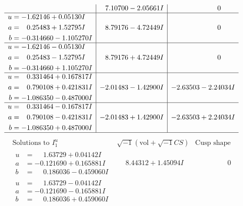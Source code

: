 \documentclass[1p]{elsarticle_modified}
\theoremstyle{definition}
\newcommand{\I}{\sqrt{-1}}
\begin{document}
$$\begin{array}{c|c|c}
 & \phantom{-}7.10700 - 2.05661 I & \phantom{-0.000000 } 0 \\ \hline\begin{aligned}
u &= -1.62146 + 0.05130 I \\
a &= \phantom{-}0.25483 + 1.52795 I \\
b &= -0.314660 - 1.105270 I\end{aligned}
 & \phantom{-}8.79176 - 4.72449 I & \phantom{-0.000000 } 0 \\ \hline\begin{aligned}
u &= -1.62146 - 0.05130 I \\
a &= \phantom{-}0.25483 - 1.52795 I \\
b &= -0.314660 + 1.105270 I\end{aligned}
 & \phantom{-}8.79176 + 4.72449 I & \phantom{-0.000000 } 0 \\ \hline\begin{aligned}
u &= \phantom{-}0.331464 + 0.167817 I \\
a &= \phantom{-}0.790108 + 0.421831 I \\
b &= -1.086350 - 0.487000 I\end{aligned}
 & -2.01483 - 1.42900 I & -2.63503 - 2.24034 I \\ \hline\begin{aligned}
u &= \phantom{-}0.331464 - 0.167817 I \\
a &= \phantom{-}0.790108 - 0.421831 I \\
b &= -1.086350 + 0.487000 I\end{aligned}
 & -2.01483 + 1.42900 I & -2.63503 + 2.24034 I\\
 \hline 
 \end{array}$$\newpage$$\begin{array}{c|c|c}  
\text{Solutions to }I^u_{1}& \I (\text{vol} + \sqrt{-1}CS) & \text{Cusp shape}\\
 \hline 
\begin{aligned}
u &= \phantom{-}1.63729 + 0.04142 I \\
a &= -0.121690 + 0.165881 I \\
b &= \phantom{-}0.186036 - 0.459060 I\end{aligned}
 & \phantom{-}8.44312 + 1.45094 I & \phantom{-0.000000 } 0 \\ \hline\begin{aligned}
u &= \phantom{-}1.63729 - 0.04142 I \\
a &= -0.121690 - 0.165881 I \\
b &= \phantom{-}0.186036 + 0.459060 I\end{aligned}

\end{array}$$
\end{document}
